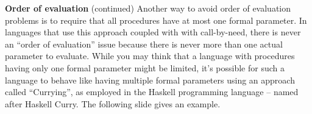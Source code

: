 \begin{minipage}[t]{\sw}
\slidenumber
\LARGE
{\bf Order of evaluation} (continued)\exx
Another way to avoid order of evaluation problems
is to require that all procedures have
at most one formal parameter.
In languages that use this approach
coupled with with call-by-need,
there is never an ``order of evaluation'' issue
because there is never more than one actual parameter to evaluate.\exx
While you may think that a language with procedures having
only one formal parameter might be limited,
it's possible for such a language
to behave like having multiple formal parameters
using an approach called ``Currying'',
as employed in the Haskell programming language
-- named after Haskell Curry.
The following slide gives an example.\exx
\end{minipage}
